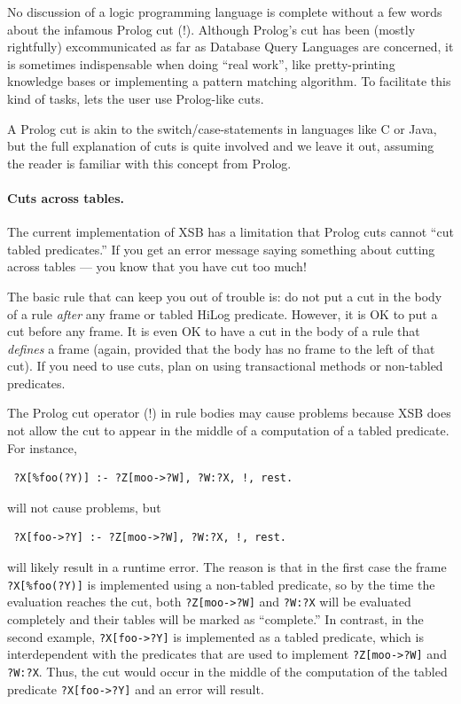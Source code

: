 \documentclass[11pt]{article}
\newcommand{\ERGO}{\mbox{\smaller{\ensuremath{\cal{E}}\smaller{{\sc{RGO}}}}}\xspace}
\newcommand{\FLSYSTEM}{\ERGO}
\begin{document}
\index{cut ("!) !in \FLSYSTEM}
No discussion of a logic programming language is complete without a few
words about the infamous Prolog cut (!). Although Prolog's cut has been
(mostly rightfully) excommunicated as far as Database Query Languages are
concerned, it is sometimes indispensable when doing ``real work'', like
pretty-printing \FLSYSTEM knowledge bases or implementing a pattern matching
algorithm.  To facilitate this kind of tasks, \FLSYSTEM lets the user
use Prolog-like cuts. 

A Prolog cut is akin to the switch/case-statements in languages
like C or Java, but the full explanation of cuts is quite involved
and we leave it out, assuming the reader is familiar with this concept from
Prolog.

\paragraph{Cuts across tables.}
The current implementation of XSB has a limitation that
Prolog cuts cannot ``cut tabled predicates.''  If you get an error
message saying something about cutting across tables --- you know that
you have cut too much!

The basic rule that can keep you out of trouble is: do not put a cut in the
body of a rule \emph{after} any frame or tabled  HiLog
predicate. However, it is OK to put a cut before any frame. It is
even OK to have a cut in the body of a rule that \emph{defines} a
frame (again, provided that the body has no frame to the left of
that cut). If you need to use cuts, plan on using transactional methods or
non-tabled predicates.

The Prolog cut operator (!) in rule bodies may cause problems because
XSB does not allow the cut to appear in the middle of a computation of a
tabled predicate. For instance,
\begin{verbatim}
 ?X[%foo(?Y)] :- ?Z[moo->?W], ?W:?X, !, rest.  
\end{verbatim}
will not cause problems, but
\begin{verbatim}
 ?X[foo->?Y] :- ?Z[moo->?W], ?W:?X, !, rest.  
\end{verbatim}
will likely result in a runtime error. The reason is that in the first case
the frame \verb|?X[%foo(?Y)]| is implemented using a non-tabled predicate, so
by the time the evaluation reaches the cut, both \verb|?Z[moo->?W]| and 
{\tt ?W:?X} will be evaluated completely and their tables will be marked as
``complete.'' In contrast, in the second example, \verb|?X[foo->?Y]| is
implemented as a tabled predicate, which is interdependent with the
predicates that are used to implement \verb|?Z[moo->?W]| and 
{\tt ?W:?X}. Thus, the cut would occur in the middle of the computation of
the tabled predicate \verb|?X[foo->?Y]| and an error will result.
\end{document}
